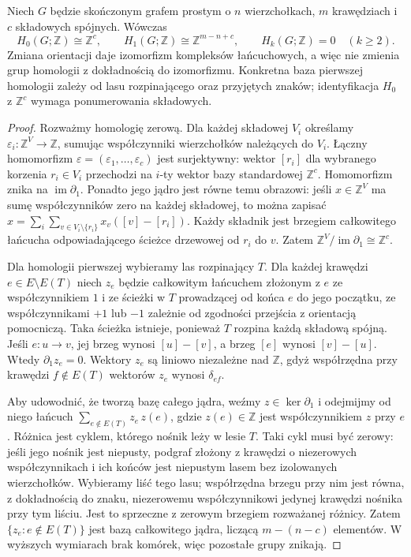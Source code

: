 \begin{twierdzenie}
\label{thm:tg-homology}
Niech $G$ będzie skończonym grafem prostym o $n$ wierzchołkach,
$m$ krawędziach i $c$ składowych spójnych. Wówczas
\[
H_0(G;\mathbb Z)\cong\mathbb Z^c,\qquad
H_1(G;\mathbb Z)\cong\mathbb Z^{m-n+c},\qquad
H_k(G;\mathbb Z)=0\quad(k\ge2).
\]
Zmiana orientacji daje izomorfizm kompleksów łańcuchowych,
a więc nie zmienia grup homologii z dokładnością do izomorfizmu.
Konkretna baza pierwszej homologii zależy od lasu rozpinającego
oraz przyjętych znaków; identyfikacja $H_0$ z $\mathbb Z^c$
wymaga ponumerowania składowych.
\end{twierdzenie}

\begin{proof}
Rozważmy homologię zerową. Dla każdej składowej $V_i$ określamy
$\varepsilon_i:\mathbb Z^V\to\mathbb Z$, sumując współczynniki
wierzchołków należących do $V_i$. Łączny homomorfizm
$\varepsilon=(\varepsilon_1,\ldots,\varepsilon_c)$ jest surjektywny:
wektor $[r_i]$ dla wybranego korzenia $r_i\in V_i$ przechodzi
na $i$-ty wektor bazy standardowej $\mathbb Z^c$.
Homomorfizm znika na $\operatorname{im}\partial_1$. Ponadto jego jądro jest
równe temu obrazowi: jeśli $x\in\mathbb Z^V$ ma sumę współczynników
zero na każdej składowej, to można zapisać
$x=\sum_i\sum_{v\in V_i\setminus\{r_i\}}x_v([v]-[r_i])$.
Każdy składnik jest brzegiem całkowitego łańcucha odpowiadającego
ścieżce drzewowej od $r_i$ do $v$. Zatem
$\mathbb Z^V/\operatorname{im}\partial_1\cong\mathbb Z^c$.

Dla homologii pierwszej wybieramy las rozpinający $T$.
Dla każdej krawędzi $e\in E\setminus E(T)$ niech $z_e$
będzie całkowitym łańcuchem złożonym z $e$ ze współczynnikiem
$1$ i ze ścieżki w $T$ prowadzącej od końca $e$ do jego początku,
ze współczynnikami $+1$ lub $-1$ zależnie od zgodności przejścia
z orientacją pomocniczą. Taka ścieżka istnieje, ponieważ $T$
rozpina każdą składową spójną. Jeśli $e:u\to v$, jej brzeg
wynosi $[u]-[v]$, a brzeg $[e]$ wynosi $[v]-[u]$.
Wtedy $\partial_1z_e=0$. Wektory $z_e$ są liniowo
niezależne nad $\mathbb Z$, gdyż współrzędna przy krawędzi
$f\notin E(T)$ wektorów $z_e$ wynosi $\delta_{ef}$.

Aby udowodnić, że tworzą bazę całego jądra, weźmy
$z\in\ker\partial_1$ i odejmijmy od niego łańcuch
$\sum_{e\notin E(T)}z_e\,z(e)$, gdzie $z(e)\in\mathbb Z$
jest współczynnikiem $z$ przy $e$. Różnica jest cyklem,
którego nośnik leży w lesie $T$. Taki cykl musi być zerowy:
jeśli jego nośnik jest niepusty, podgraf złożony z krawędzi
o niezerowych współczynnikach i ich końców jest niepustym
lasem bez izolowanych wierzchołków. Wybieramy liść tego lasu;
współrzędna brzegu przy nim jest równa, z dokładnością
do znaku, niezerowemu współczynnikowi jedynej krawędzi
nośnika przy tym liściu. Jest to sprzeczne z zerowym brzegiem
rozważanej różnicy.
Zatem $\{z_e:e\notin E(T)\}$ jest bazą całkowitego
jądra, liczącą $m-(n-c)$ elementów. W wyższych wymiarach
brak komórek, więc pozostałe grupy znikają.


\end{proof}

